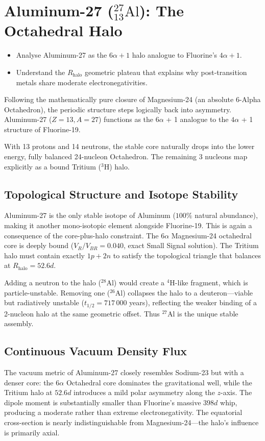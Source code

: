 \chapter{Aluminum-27 ($^{27}_{13}\text{Al}$): The Octahedral Halo}
\label{ch:aluminum}

\begin{objectivebox}
\begin{itemize}
    \item Analyse Aluminum-27 as the $6\alpha + 1$ halo analogue to Fluorine's $4\alpha + 1$.
    \item Understand the $R_{\text{halo}}$ geometric plateau that explains why post-transition metals share moderate electronegativities.
\end{itemize}
\end{objectivebox}


Following the mathematically pure closure of Magnesium-24 (an absolute 6-Alpha Octahedron), the periodic structure steps logically back into asymmetry. Aluminum-27 ($Z=13, A=27$) functions as the $6\alpha$ + 1 analogue to the $4\alpha$ + 1 structure of Fluorine-19. 

With 13 protons and 14 neutrons, the stable core naturally drops into the lower energy, fully balanced 24-nucleon Octahedron. The remaining 3 nucleons map explicitly as a bound Tritium ($^3\text{H}$) halo.

\section{Topological Structure and Isotope Stability}
Aluminum-27 is the only stable isotope of Aluminum ($100\%$ natural abundance), making it another mono-isotopic element alongside Fluorine-19. This is again a consequence of the core-plus-halo constraint. The $6\alpha$ Magnesium-24 octahedral core is deeply bound ($V_R/V_{BR} = 0.040$, exact Small Signal solution). The Tritium halo must contain exactly $1p + 2n$ to satisfy the topological triangle that balances at $R_{\text{halo}} = 52.6d$.

Adding a neutron to the halo ($^{28}$Al) would create a $^4\text{H}$-like fragment, which is particle-unstable. Removing one ($^{26}$Al) collapses the halo to a deuteron---viable but radiatively unstable ($t_{1/2} = 717\,000$ years), reflecting the weaker binding of a 2-nucleon halo at the same geometric offset. Thus $^{27}$Al is the unique stable assembly.

\section{Continuous Vacuum Density Flux}
The vacuum metric of Aluminum-27 closely resembles Sodium-23 but with a denser core: the $6\alpha$ Octahedral core dominates the gravitational well, while the Tritium halo at $52.6d$ introduces a mild polar asymmetry along the $z$-axis. The dipole moment is substantially smaller than Fluorine's massive $398d$ whip, producing a moderate rather than extreme electronegativity. The equatorial cross-section is nearly indistinguishable from Magnesium-24---the halo's influence is primarily axial.

